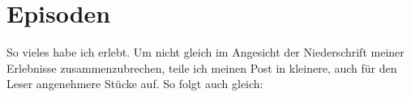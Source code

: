\chapter{Episoden}

So vieles habe ich erlebt. Um nicht gleich im Angesicht der
Niederschrift meiner Erlebnisse zusammenzubrechen, teile ich meinen Post
in kleinere, auch für den Leser angenehmere Stücke auf. So folgt auch
gleich:
